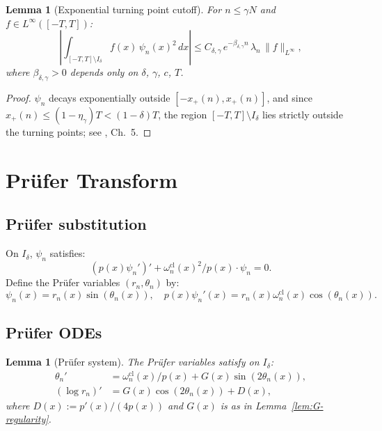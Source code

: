 \documentclass[12pt,a4paper]{amsart}
\newtheorem{lemma}[theorem]{Lemma}
\newcommand{\psin}{\psi_n}
\newcommand{\wncl}{\omega_n^{\mathrm{cl}}}
\begin{document}
\begin{lemma}[Exponential turning point cutoff]%
\label{lem:turning-point-cutoff}
For $n \le \gamma N$ and $f \in L^\infty([-T,T])$:
\begin{equation}\label{eq:cutoff}
  \left|\int_{[-T,T]\setminus I_\delta}
    f(x)\,\psin(x)^2\,dx\right|
  \le C_{\delta,\gamma}\,e^{-\beta_{\delta,\gamma} n}\,
     \lambda_n\,\|f\|_{L^\infty},
\end{equation}
where $\beta_{\delta,\gamma} > 0$ depends only on
$\delta$, $\gamma$, $c$, $T$.
\end{lemma}

\begin{proof}
$\psin$ decays exponentially outside $[-x_+(n), x_+(n)]$,
and since $x_+(n) \le (1-\eta_\gamma)T < (1-\delta)T$,
the region $[-T,T]\setminus I_\delta$ lies strictly outside
the turning points; see \cite{OsipovRokhlinXiao}, Ch.~5.
\end{proof}

\section{Pr\"ufer Transform}\label{sec:prufer}

\subsection{Pr\"ufer substitution}

On $I_\delta$, $\psin$ satisfies:
\begin{equation}\label{eq:SL}
  (p(x)\psin')' + \wncl(x)^2/p(x)\cdot\psin = 0.
\end{equation}
Define the Pr\"ufer variables $(r_n, \theta_n)$ by:
\begin{equation}\label{eq:prufer-def}
  \psin(x) = r_n(x)\sin(\theta_n(x)),
  \quad
  p(x)\psin'(x) = r_n(x)\wncl(x)\cos(\theta_n(x)).
\end{equation}

\subsection{Pr\"ufer ODEs}

\begin{lemma}[Pr\"ufer system]\label{lem:prufer-ode}
The Pr\"ufer variables satisfy on $I_\delta$:
\begin{align}
  \theta_n'
  &= \wncl(x)/p(x) + G(x)\sin(2\theta_n(x)),
  \label{eq:theta-ode}\\
  (\log r_n)'
  &= G(x)\cos(2\theta_n(x)) + D(x),
  \label{eq:r-ode}
\end{align}
where $D(x) := p'(x)/(4p(x))$ and $G(x)$ is as in
Lemma~\ref{lem:G-regularity}.
\end{lemma}
\end{document}

